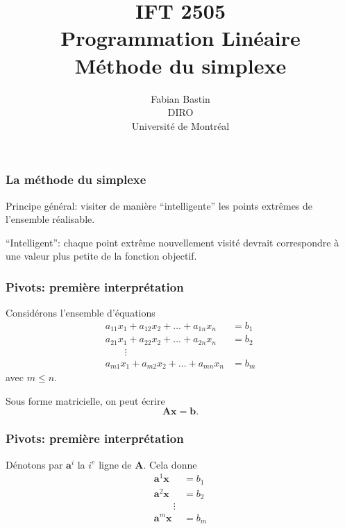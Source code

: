 \documentclass[t,usepdftitle=false]{beamer}
\title[IFT2505]{IFT 2505\\Programmation Linéaire\\Méthode du simplexe}
\author[Fabian Bastin]{Fabian Bastin\\DIRO\\Université de Montréal}
\date{}
\def\ba{\boldsymbol{a}}
\def\bb{\boldsymbol{b}}
\def\bx{\boldsymbol{x}}
\def\bA{\boldsymbol{A}}
\begin{document}
\frame{\titlepage}

\begin{frame}
\frametitle{La méthode du simplexe}

Principe général: visiter de manière ``intelligente'' les points extrêmes de l'ensemble réalisable.

\mbox{}

``Intelligent'': chaque point extrême nouvellement visité devrait correspondre à une valeur plus petite de la fonction objectif.

\end{frame}
\begin{frame}
\frametitle{Pivots: première interprétation}

Considérons l'ensemble d'équations
\begin{align*}
a_{11}x_1 + a_{12}x_2 + \ldots + a_{1n}x_n &= b_1 \\
a_{21}x_1 + a_{22}x_2 + \ldots + a_{2n}x_n &= b_2 \\
\qquad \vdots \\
a_{m1}x_1 + a_{m2}x_2 + \ldots + a_{mn}x_n &= b_m
\end{align*}
avec $m \leq n$.

\mbox{}

Sous forme matricielle, on peut écrire
\[
\bA \bx = \bb.
\]

\end{frame}

\begin{frame}
\frametitle{Pivots: première interprétation}

Dénotons par $\ba^i$ la $i^e$ ligne de $\bA$. Cela donne
\begin{align*}
\ba^1 \bx &= b_1 \\
\ba^2 \bx &= b_2 \\
\qquad \vdots \\
\ba^m \bx &= b_m
\end{align*}

\end{frame}
\end{document}
